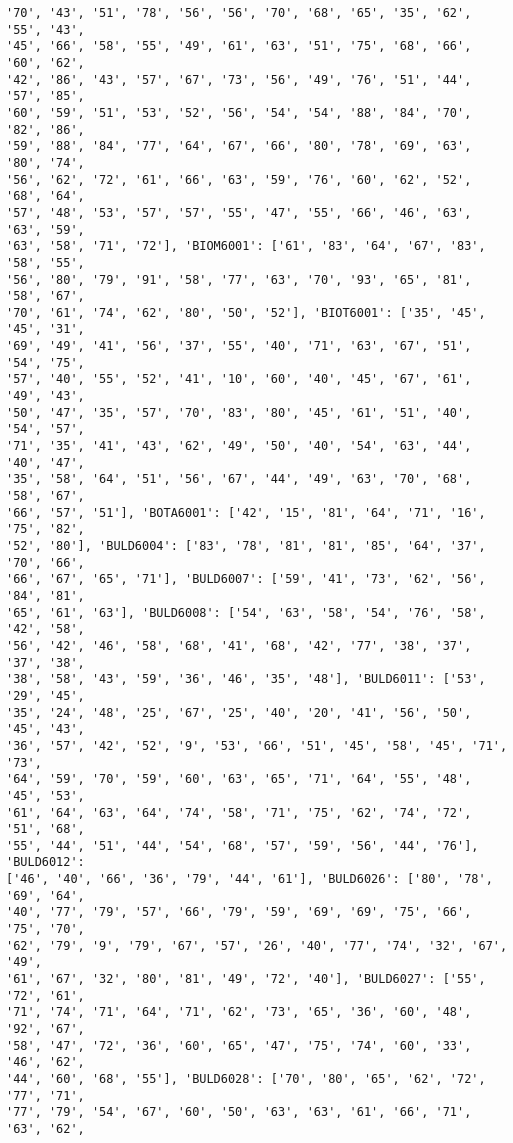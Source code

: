 \documentclass[11pt]{article}
\begin{document}
\begin{Verbatim}[commandchars=\\\{\}]
'70', '43', '51', '78', '56', '56', '70', '68', '65', '35', '62', '55', '43',
'45', '66', '58', '55', '49', '61', '63', '51', '75', '68', '66', '60', '62',
'42', '86', '43', '57', '67', '73', '56', '49', '76', '51', '44', '57', '85',
'60', '59', '51', '53', '52', '56', '54', '54', '88', '84', '70', '82', '86',
'59', '88', '84', '77', '64', '67', '66', '80', '78', '69', '63', '80', '74',
'56', '62', '72', '61', '66', '63', '59', '76', '60', '62', '52', '68', '64',
'57', '48', '53', '57', '57', '55', '47', '55', '66', '46', '63', '63', '59',
'63', '58', '71', '72'], 'BIOM6001': ['61', '83', '64', '67', '83', '58', '55',
'56', '80', '79', '91', '58', '77', '63', '70', '93', '65', '81', '58', '67',
'70', '61', '74', '62', '80', '50', '52'], 'BIOT6001': ['35', '45', '45', '31',
'69', '49', '41', '56', '37', '55', '40', '71', '63', '67', '51', '54', '75',
'57', '40', '55', '52', '41', '10', '60', '40', '45', '67', '61', '49', '43',
'50', '47', '35', '57', '70', '83', '80', '45', '61', '51', '40', '54', '57',
'71', '35', '41', '43', '62', '49', '50', '40', '54', '63', '44', '40', '47',
'35', '58', '64', '51', '56', '67', '44', '49', '63', '70', '68', '58', '67',
'66', '57', '51'], 'BOTA6001': ['42', '15', '81', '64', '71', '16', '75', '82',
'52', '80'], 'BULD6004': ['83', '78', '81', '81', '85', '64', '37', '70', '66',
'66', '67', '65', '71'], 'BULD6007': ['59', '41', '73', '62', '56', '84', '81',
'65', '61', '63'], 'BULD6008': ['54', '63', '58', '54', '76', '58', '42', '58',
'56', '42', '46', '58', '68', '41', '68', '42', '77', '38', '37', '37', '38',
'38', '58', '43', '59', '36', '46', '35', '48'], 'BULD6011': ['53', '29', '45',
'35', '24', '48', '25', '67', '25', '40', '20', '41', '56', '50', '45', '43',
'36', '57', '42', '52', '9', '53', '66', '51', '45', '58', '45', '71', '73',
'64', '59', '70', '59', '60', '63', '65', '71', '64', '55', '48', '45', '53',
'61', '64', '63', '64', '74', '58', '71', '75', '62', '74', '72', '51', '68',
'55', '44', '51', '44', '54', '68', '57', '59', '56', '44', '76'], 'BULD6012':
['46', '40', '66', '36', '79', '44', '61'], 'BULD6026': ['80', '78', '69', '64',
'40', '77', '79', '57', '66', '79', '59', '69', '69', '75', '66', '75', '70',
'62', '79', '9', '79', '67', '57', '26', '40', '77', '74', '32', '67', '49',
'61', '67', '32', '80', '81', '49', '72', '40'], 'BULD6027': ['55', '72', '61',
'71', '74', '71', '64', '71', '62', '73', '65', '36', '60', '48', '92', '67',
'58', '47', '72', '36', '60', '65', '47', '75', '74', '60', '33', '46', '62',
'44', '60', '68', '55'], 'BULD6028': ['70', '80', '65', '62', '72', '77', '71',
'77', '79', '54', '67', '60', '50', '63', '63', '61', '66', '71', '63', '62',

\end{Verbatim}
\end{document}
